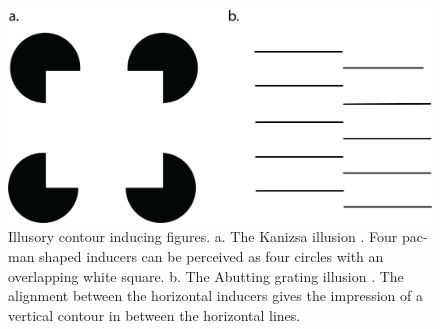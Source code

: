 \documentclass[12pt]{article}
\begin{document}
\begin{figure}[H]
  \centering
  \includegraphics[width=1.0\textwidth]{adjusted_figures/illusory_figures_kanizsa_grating.png}
  \caption{Illusory contour inducing figures. a. The Kanizsa illusion \autocite{kanizsaSubjectiveContours1976}. Four pac-man shaped inducers can be perceived as four circles with an overlapping white square. b. The Abutting grating illusion \autocite{sorianoAbuttingGratingIllusion1996}. The alignment between the horizontal inducers gives the impression of a vertical contour in between the horizontal lines.}
  \label{fig:figure_1}
\end{figure}
\end{document}
